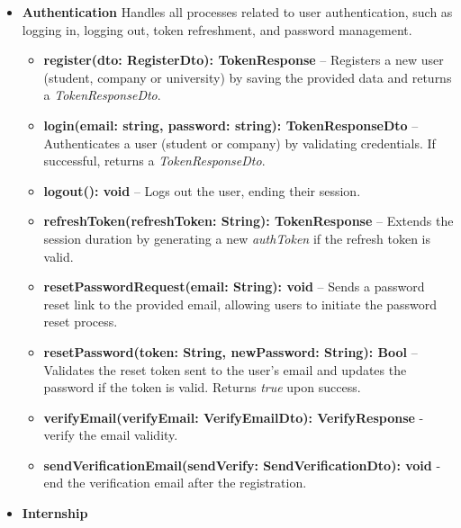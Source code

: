 \begin{itemize}
\item \textbf{Authentication}
Handles all processes related to user authentication, such as logging in, logging out, token refreshment, and password management.

\begin{itemize}
    \item \textbf{register(dto: RegisterDto): TokenResponse} – Registers a new user (student, company or university) by saving the provided data and returns a \textit{TokenResponseDto}.
    \item \textbf{login(email: string, password: string): TokenResponseDto} – Authenticates a user (student or company) by validating credentials. If successful, returns a \textit{TokenResponseDto}.
    \item \textbf{logout(): void} – Logs out the user, ending their session.
    \item \textbf{refreshToken(refreshToken: String): TokenResponse} – Extends the session duration by generating a new \textit{authToken} if the refresh token is valid.
    \item \textbf{resetPasswordRequest(email: String): void} – Sends a password reset link to the provided email, allowing users to initiate the password reset process.
    \item \textbf{resetPassword(token: String, newPassword: String): Bool} – Validates the reset token sent to the user's email and updates the password if the token is valid. Returns \textit{true} upon success.
    \item \textbf{verifyEmail(verifyEmail: VerifyEmailDto): VerifyResponse} - verify the email validity.
    \item \textbf{sendVerificationEmail(sendVerify: SendVerificationDto): void} - end the verification email after the registration.
\end{itemize}

\item \textbf{Internship}


\end{itemize}
